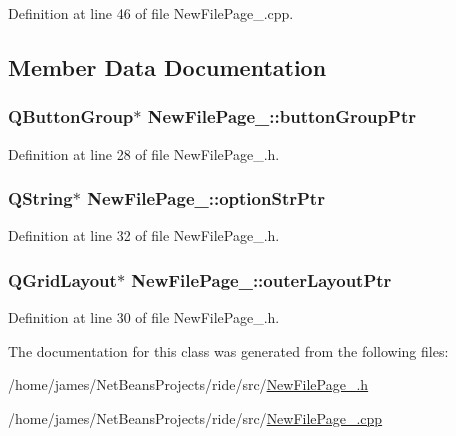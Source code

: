 Definition at line 46 of file New\-File\-Page\-\_.\-cpp.



\subsection{Member Data Documentation}
\hypertarget{class_new_file_page__2_a1eaed1480c571a3bb321bc13707056c8}{
\subsubsection[{button\-Group\-Ptr}]{\setlength{\rightskip}{0pt plus 5cm}Q\-Button\-Group$\ast$ New\-File\-Page\-\_\-::button\-Group\-Ptr\hspace{0.3cm}{\ttfamily [private]}}}\label{class_new_file_page__2_a1eaed1480c571a3bb321bc13707056c8}


Definition at line 28 of file New\-File\-Page\-\_.\-h.

\hypertarget{class_new_file_page__2_a8be9fd0cc47bdaa93967f604d8ca081a}{
\subsubsection[{option\-Str\-Ptr}]{\setlength{\rightskip}{0pt plus 5cm}Q\-String$\ast$ New\-File\-Page\-\_\-::option\-Str\-Ptr\hspace{0.3cm}{\ttfamily [private]}}}\label{class_new_file_page__2_a8be9fd0cc47bdaa93967f604d8ca081a}


Definition at line 32 of file New\-File\-Page\-\_.\-h.

\hypertarget{class_new_file_page__2_aeebed0ee7d06690f79843b0b926e937c}{
\subsubsection[{outer\-Layout\-Ptr}]{\setlength{\rightskip}{0pt plus 5cm}Q\-Grid\-Layout$\ast$ New\-File\-Page\-\_\-::outer\-Layout\-Ptr\hspace{0.3cm}{\ttfamily [private]}}}\label{class_new_file_page__2_aeebed0ee7d06690f79843b0b926e937c}


Definition at line 30 of file New\-File\-Page\-\_.\-h.



The documentation for this class was generated from the following files\-:\begin{DoxyCompactItemize}
\item 
/home/james/\-Net\-Beans\-Projects/ride/src/\hyperlink{_new_file_page__2_8h}{New\-File\-Page\-\_.\-h}\item 
/home/james/\-Net\-Beans\-Projects/ride/src/\hyperlink{_new_file_page__2_8cpp}{New\-File\-Page\-\_.\-cpp}\end{DoxyCompactItemize}
